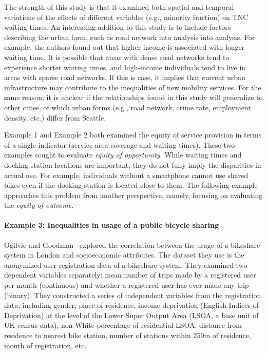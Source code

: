 \documentclass[11pt]{article}
\begin{document}
The strength of this study is that it examined both spatial and temporal variations of the effects of different variables (e.g., minority fraction) on TNC waiting times. An interesting addition to this study is to include factors describing the urban form, such as road network into analysis into analysis. For example, the authors found out that higher income is associated with longer waiting time. It is possible that areas with dense road networks tend to experience shorter waiting times, and high-income individuals tend to live in areas with sparse road networks. If this is case, it implies that current urban infrastructure may contribute to the inequalities of new mobility services. For the same reason, it is unclear if the relationships found in this study will generalize to other cities, of which urban forms (e.g., road network, crime rate, employment density, etc.) differ from Seattle. 

Example 1 and Example 2 both examined the equity of service provision in terms of a single indicator (service area coverage and waiting times). These two examples sought to evaluate \textit{equity of opportunity}. While waiting times and docking station locations are important, they do not fully imply the disparities in actual use. For example, individuals without a smartphone cannot use shared bikes even if the docking station is located close to them. The following example approaches this problem from another perspective, namely, focusing on evaluating the \textit{equity of outcome}.  

\paragraph{Example 3: Inequalities in usage of a public bicycle sharing}
Ogilvie and Goodman~\cite{ogilvie2012inequalities} explored the correlation between the usage of a bikeshare system in London and socioeconomic attributes. The dataset they use is the anonymized user registration data of a bikeshare system. They examined two dependent variables separately: mean number of trips made by a registered user per month (continuous) and whether a registered user has ever made any trip (binary). They constructed a series of independent variables from the registration data, including gender, place of residence, income deprivation (English Indices of Deprivation) at the level of the Lower Super Output Area (LSOA, a base unit of UK census data), non-White percentage of residential LSOA, distance from residence to nearest bike station, number of stations within 250m of residence, month of registration, etc. 
\end{document}

